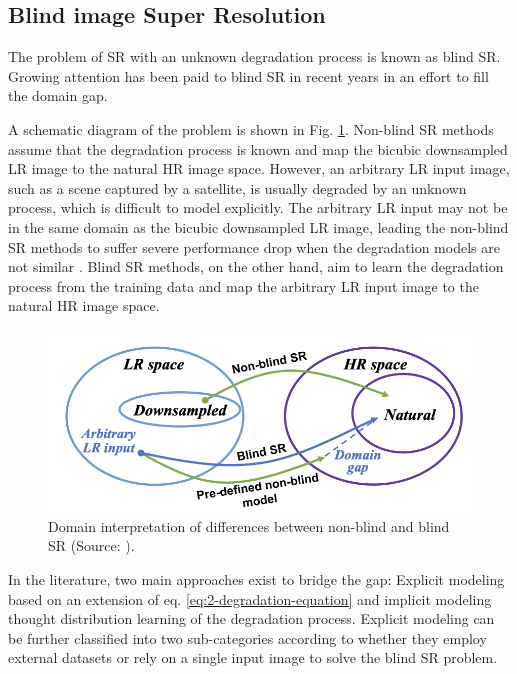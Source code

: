     \subsection{Blind image Super Resolution}

        The problem of SR with an unknown degradation process is known as blind SR. 
        Growing attention has been paid to blind SR in recent years in an effort to fill the domain gap.
        
        A schematic diagram of the problem is shown in Fig. \ref{fig:2-DomainGap}. 
        Non-blind SR methods assume that the degradation process is known and map the bicubic downsampled LR image to the natural HR image space.
        However, an arbitrary LR input image, such as a scene captured by a satellite, is usually degraded by an unknown process, which is difficult to model explicitly.
        The arbitrary LR input may not be in the same domain as the bicubic downsampled LR image, leading the non-blind SR methods to suffer severe performance drop when the degradation models are not similar \cite{accurateblurs2013}.
        Blind SR methods, on the other hand, aim to learn the degradation process from the training data and map the arbitrary LR input image to the natural HR image space.
        
        \begin{figure}[H]
            \centering
            \includegraphics[width=\textwidth]{Includes/2-DomainGap.png}
            \caption{Domain interpretation of differences between non-blind and blind SR (Source: \cite{liu2021blind}).}
            \label{fig:2-DomainGap}
        \end{figure}

        In the literature, two main approaches exist to bridge the gap: 
        Explicit modeling based on an extension of eq. \ref{eq:2-degradation-equation} and implicit modeling thought distribution learning of the degradation process.
        Explicit modeling can be further classified into two sub-categories according to whether they employ external datasets or rely on a single input image to solve the blind SR problem.


